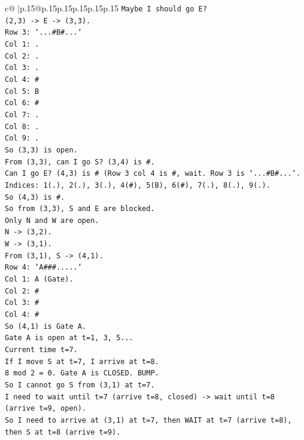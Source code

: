 \documentclass{article}
\begin{document}
{\begin{supertabular}{c@{$\;$}|p{.15\linewidth}@{}p{.15\linewidth}p{.15\linewidth}p{.15\linewidth}p{.15\linewidth}p{.15\linewidth}}
{{{\texttt{Maybe I should go E?} \\
\texttt{(2,3) {-}> E {-}> (3,3).} \\
\texttt{Row 3: `...\#B\#...`} \\
\texttt{Col 1: .} \\
\texttt{Col 2: .} \\
\texttt{Col 3: .} \\
\texttt{Col 4: \#} \\
\texttt{Col 5: B} \\
\texttt{Col 6: \#} \\
\texttt{Col 7: .} \\
\texttt{Col 8: .} \\
\texttt{Col 9: .} \\
\texttt{So (3,3) is open.} \\
\texttt{From (3,3), can I go S? (3,4) is \#.} \\
\texttt{Can I go E? (4,3) is \# (Row 3 col 4 is \#, wait. Row 3 is `...\#B\#...`.} \\
\texttt{Indices: 1(.), 2(.), 3(.), 4(\#), 5(B), 6(\#), 7(.), 8(.), 9(.).} \\
\texttt{So (4,3) is \#.} \\
\texttt{So from (3,3), S and E are blocked.} \\
\texttt{Only N and W are open.} \\
\texttt{N {-}> (3,2).} \\
\texttt{W {-}> (3,1).} \\
\texttt{From (3,1), S {-}> (4,1).} \\
\texttt{Row 4: `A\#\#\#.....`} \\
\texttt{Col 1: A (Gate).} \\
\texttt{Col 2: \#} \\
\texttt{Col 3: \#} \\
\texttt{Col 4: \#} \\
\texttt{So (4,1) is Gate A.} \\
\texttt{Gate A is open at t=1, 3, 5...} \\
\texttt{Current time t=7.} \\
\texttt{If I move S at t=7, I arrive at t=8.} \\
\texttt{8 mod 2 = 0. Gate A is CLOSED. BUMP.} \\
\texttt{So I cannot go S from (3,1) at t=7.} \\
\texttt{I need to wait until t=7 (arrive t=8, closed) {-}> wait until t=8 (arrive t=9, open).} \\
\texttt{So I need to arrive at (3,1) at t=7, then WAIT at t=7 (arrive t=8), then S at t=8 (arrive t=9).} \\
}}}
\end{supertabular}}
\end{document}
